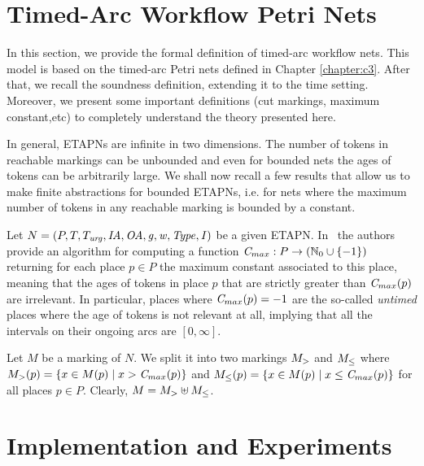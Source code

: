 
\section{Timed-Arc Workflow Petri Nets} \label{sec:def}
In this section, we provide the formal definition of timed-arc workflow nets. This model is based on the 
timed-arc Petri nets defined in Chapter \ref{chapter:c3}. After that, we recall the soundness definition, extending it
to the time setting. Moreover, we present some important definitions (cut markings, maximum constant,etc) 
to completely understand the theory presented here.

In general, ETAPNs are infinite in two dimensions. The number of tokens
in reachable markings can be unbounded and even for bounded nets
the ages of tokens can be arbitrarily large. We shall now recall a 
few results that allow us to make finite abstractions for bounded
ETAPNs, i.e. for nets where the maximum number of tokens in any
reachable marking is bounded by a constant.

Let $N=(P, T, T_{\mathit{urg}}, \mathit{IA},\allowbreak \mathit{OA}, \mathit{g}, \mathit{w}, \mathit{Type}, \mathit{I})$ be a given ETAPN.
In~\cite{ALSST:MEMICS:12} 
the authors provide an algorithm for computing 
a function $\mathit{C}_{max}: P \rightarrow (\mathbb{N}_{0} \cup \{ -1 \})$ 
returning for each place $p \in P$ the maximum constant associated
to this place, meaning that the ages of tokens in place $p$ that
are strictly greater than $\mathit{C}_{max}(p)$ are irrelevant. In particular,
places where $\mathit{C}_{max}(p)=-1$ are the so-called \emph{untimed} places
where the age of tokens is not relevant at all, implying that all
the intervals on their ongoing arcs are $[0,\infty]$.

Let $M$ be a marking of $N$. We split it into 
two markings $M_{>}$ and $M_{\leq}$ where 
$M_{>} (p)=\left\{ x\in M(p) \mid x>\mathit{C}_{max}(p) \right\}$ 
and $M_{\leq} (p)=\allowbreak\left\{ x\in M(p) \mid 
x\allowbreak\leq\allowbreak \mathit{C}_{max}(p) \right\}$
for all places $p \in P$. Clearly,
$M = M_{>} \uplus M_{\leq}$.






\section{Implementation and Experiments}


